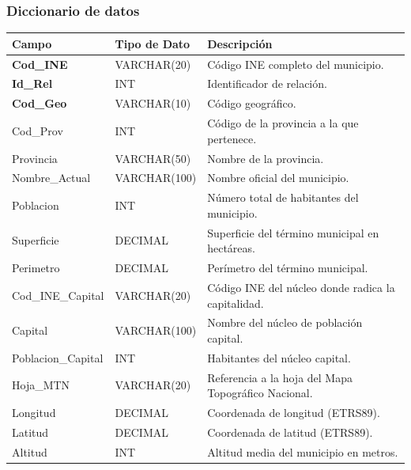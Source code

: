\documentclass[12pt, a4paper]{article}
\begin{document}
\subsubsection*{Diccionario de datos}
\begin{center}
\begin{tabular}{|p{}|p{}|p{}|}
\hline
\textbf{Campo} & \textbf{Tipo de Dato} & \textbf{Descripción} \\
\hline
\textbf{Cod\_INE} & VARCHAR(20) & Código INE completo del municipio. \\
\textbf{Id\_Rel} & INT & Identificador de relación. \\
\textbf{Cod\_Geo} & VARCHAR(10) & Código geográfico. \\
Cod\_Prov & INT & Código de la provincia a la que pertenece. \\
Provincia & VARCHAR(50) & Nombre de la provincia. \\
Nombre\_Actual & VARCHAR(100) & Nombre oficial del municipio. \\
Poblacion & INT & Número total de habitantes del municipio. \\
Superficie & DECIMAL & Superficie del término municipal en hectáreas. \\
Perimetro & DECIMAL & Perímetro del término municipal. \\
Cod\_INE\_Capital & VARCHAR(20) & Código INE del núcleo donde radica la capitalidad. \\
Capital & VARCHAR(100) & Nombre del núcleo de población capital. \\
Poblacion\_Capital & INT & Habitantes del núcleo capital. \\
Hoja\_MTN & VARCHAR(20) & Referencia a la hoja del Mapa Topográfico Nacional. \\
Longitud & DECIMAL & Coordenada de longitud (ETRS89). \\
Latitud & DECIMAL & Coordenada de latitud (ETRS89). \\
Altitud & INT & Altitud media del municipio en metros. \\
\hline
\end{tabular}
\end{center}

\newpage
\end{document}
